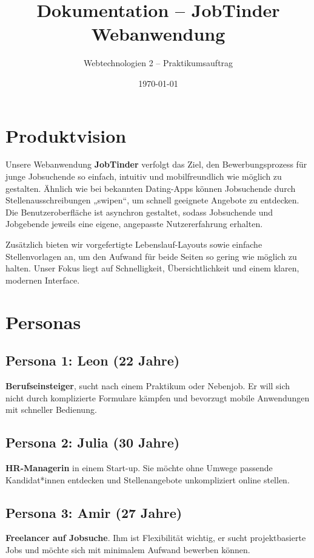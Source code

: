 \documentclass[a4paper,12pt]{article}
\title{\textbf{Dokumentation – JobTinder Webanwendung}}
\author{Webtechnologien 2 – Praktikumsauftrag}
\date{\today}
\begin{document}
\maketitle

\section{Produktvision}

Unsere Webanwendung \textbf{JobTinder} verfolgt das Ziel, den Bewerbungsprozess für junge Jobsuchende so einfach, intuitiv und mobilfreundlich wie möglich zu gestalten. Ähnlich wie bei bekannten Dating-Apps können Jobsuchende durch Stellenausschreibungen „swipen“, um schnell geeignete Angebote zu entdecken. Die Benutzeroberfläche ist asynchron gestaltet, sodass Jobsuchende und Jobgebende jeweils eine eigene, angepasste Nutzererfahrung erhalten.

Zusätzlich bieten wir vorgefertigte Lebenslauf-Layouts sowie einfache Stellenvorlagen an, um den Aufwand für beide Seiten so gering wie möglich zu halten. Unser Fokus liegt auf Schnelligkeit, Übersichtlichkeit und einem klaren, modernen Interface.

\section{Personas}

\subsection*{Persona 1: Leon (22 Jahre)}
\textbf{Berufseinsteiger}, sucht nach einem Praktikum oder Nebenjob. Er will sich nicht durch komplizierte Formulare kämpfen und bevorzugt mobile Anwendungen mit schneller Bedienung.

\subsection*{Persona 2: Julia (30 Jahre)}
\textbf{HR-Managerin} in einem Start-up. Sie möchte ohne Umwege passende Kandidat*innen entdecken und Stellenangebote unkompliziert online stellen.

\subsection*{Persona 3: Amir (27 Jahre)}
\textbf{Freelancer auf Jobsuche}. Ihm ist Flexibilität wichtig, er sucht projektbasierte Jobs und möchte sich mit minimalem Aufwand bewerben können.
\end{document}
